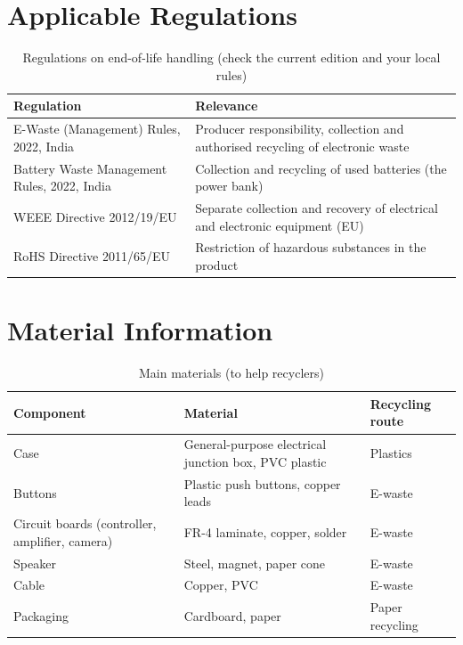 \documentclass[11pt,a4paper,oneside]{report}
\newcommand{\hdr}[1]{\cellcolor{LightBlue}\textbf{#1}}
\begin{document}
\section{Applicable Regulations}
\begin{table}[H]\centering\small
\caption{Regulations on end-of-life handling (check the current edition and your local rules)}
\begin{tabularx}{\linewidth}{|l|X|}\hline
\hdr{Regulation} & \hdr{Relevance}\\ \hline
E-Waste (Management) Rules, 2022, India & Producer responsibility, collection and authorised recycling of electronic waste\\ \hline
Battery Waste Management Rules, 2022, India & Collection and recycling of used batteries (the power bank)\\ \hline
WEEE Directive 2012/19/EU & Separate collection and recovery of electrical and electronic equipment (EU)\\ \hline
RoHS Directive 2011/65/EU & Restriction of hazardous substances in the product\\ \hline
\end{tabularx}\end{table}

\section{Material Information}
\begin{table}[H]\centering\small
\caption{Main materials (to help recyclers)}
\begin{tabularx}{\linewidth}{|l|X|l|}\hline
\hdr{Component} & \hdr{Material} & \hdr{Recycling route}\\ \hline
Case & General-purpose electrical junction box, PVC plastic & Plastics\\ \hline
Buttons & Plastic push buttons, copper leads & E-waste\\ \hline
Circuit boards (controller, amplifier, camera) & FR-4 laminate, copper, solder & E-waste\\ \hline
Speaker & Steel, magnet, paper cone & E-waste\\ \hline
Cable & Copper, PVC & E-waste\\ \hline
Packaging & Cardboard, paper & Paper recycling\\ \hline
\end{tabularx}\end{table}
\end{document}
